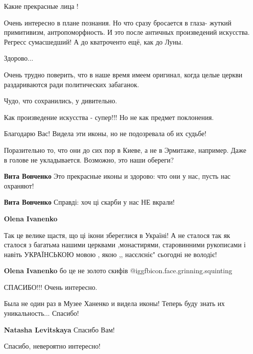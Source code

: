 \begin{itemize}
Какие прекрасные лица !


Очень интересно в плане познания. Но что сразу бросается в глаза- жуткий
примитивизм, антропоморфность. И это после античных произведений
искусства. Регресс сумасшедший! А до кватроченто ещё, как до Луны.


Здорово...

Очень трудно поверить, что в наше время имеем оригинал, когда целые церкви раздариваются ради политических забаганок.

Чудо, что сохранились, у дивительно.

Как произведение искусства - супер!!! Но не как предмет поклонения.

Благодарю Вас! Видела эти иконы, но не подозревала об их судьбе!


Поразительно то, что они до сих пор в Киеве, а не в Эрмитаже, например. Даже в
голове не укладывается. Возможно, это наши обереги?

\begin{itemize} %
\textbf{Вита Вовченко} Это прекрасные иконы и здорово: что они у нас, пусть нас охраняют!

\textbf{Вита Вовченко} Справді: хоч ці скарби у нас НЕ вкрали!

\textbf{Olena Ivanenko} 

Так це велике щастя, що ці ікони збереглися в Україні! А не сталося так як
сталося з багатьма нашими церквами ,монастирями, старовинними рукописами і
навіть УКРАЇНСЬКОЮ мовою , якою ,, насєлєніє" сьогодні не володіє!

\textbf{Olena Ivanenko} бо це не золото скифів @igg{fbicon.face.grinning.squinting} 

\end{itemize} %

СПАСИБО!!! Очень интересно.


Была не один раз в Музее Ханенко и видела иконы! Теперь буду знать их
уникальность... Спасибо!


\textbf{Natasha Levitskaya} Спасибо Вам!

Спасибо, невероятно интересно!


\end{itemize}
